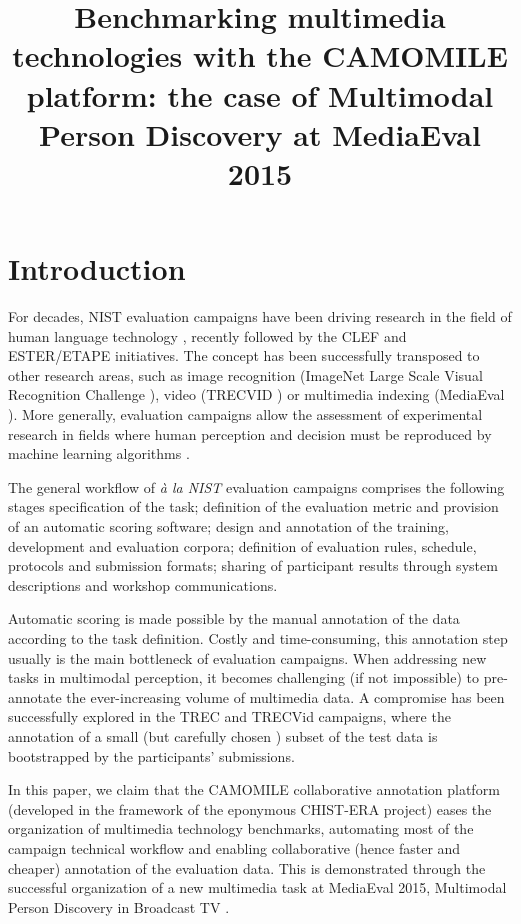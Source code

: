 \documentclass[10pt, a4paper]{article}
\title{Benchmarking multimedia technologies with the CAMOMILE platform: the case of Multimodal Person Discovery at MediaEval 2015}
\begin{document}
\maketitleabstract

\section{Introduction}

For decades, NIST evaluation campaigns have been driving research in the field
of human language technology \cite{Martin2004}, recently followed by the CLEF \cite{Peters2002} and
ESTER/ETAPE \cite{Gravier2004} initiatives. The concept has been successfully transposed to
other research areas, such as image recognition (ImageNet Large Scale Visual
Recognition Challenge \cite{Russakovsky2015}), video (TRECVID \cite{Smeaton2006}) or multimedia indexing
(MediaEval \cite{Larson2015}). More generally, evaluation campaigns allow the assessment of
experimental research in fields where human perception and decision must be
reproduced by machine learning algorithms \cite{Geoffrois2008}.

The general workflow of \textit{à la NIST} evaluation campaigns comprises the
following stages \cite{Martin2004} specification of the task; definition of the evaluation
metric and provision of an automatic scoring software; design and annotation of
the training, development and evaluation corpora; definition of evaluation
rules, schedule, protocols and submission formats; sharing of participant
results through system descriptions and workshop communications.

Automatic scoring is made possible by the manual annotation of the data
according to the task definition. Costly and time-consuming, this annotation
step usually is the main bottleneck of evaluation campaigns. When addressing
new tasks in multimodal perception, it becomes challenging (if not impossible)
to pre-annotate the ever-increasing volume of multimedia data. A compromise
has been successfully explored in the TREC and TRECVid campaigns, where
the annotation of a small (but carefully chosen \cite{Yilmaz2006}) subset of the test data is
bootstrapped by the participants' submissions.

In this paper, we claim that the CAMOMILE collaborative annotation platform
(developed in the framework of the eponymous CHIST-ERA project) eases the
organization of multimedia technology benchmarks, automating most of the
campaign technical workflow and enabling collaborative (hence faster and
cheaper) annotation of the evaluation data. This is demonstrated through the
successful organization of a new multimedia task at MediaEval 2015, Multimodal
Person Discovery in Broadcast TV \cite{Poignant2015}.
\end{document}
